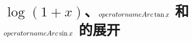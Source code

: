 \section{\texorpdfstring{$\log(1+x)$}{log(1+x)}、\texorpdfstring{$\\operatorname{Arc}\tan x$}{Arc tan x} 和 \texorpdfstring{$\\operatorname{Arc}\sin x$}{Arc sin x} 的展开}
